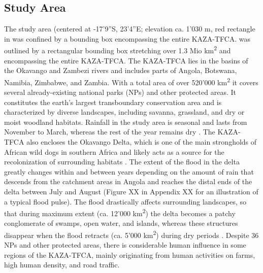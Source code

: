 \documentclass[abstract=on,10pt,a4paper,bibliography=totocnumbered]{article}
\begin{document}
\subsection{Study Area}
The study area (centered at -17'9''S, 23'4''E; elevation ca.
1'030 m, red rectangle in  was confined by a bounding box
encompassing the entire KAZA-TFCA. was outlined by a rectangular bounding box
stretching over 1.3 Mio km\textsuperscript{2} and encompassing the entire
KAZA-TFCA. The KAZA-TFCA lies in the basins of the Okavango and Zambezi rivers
and includes parts of Angola, Botswana, Namibia, Zimbabwe, and Zambia. With a
total area of over 520'000 km\textsuperscript{2} it covers several
already-existing national parks (NPs) and other protected areas. It constitutes
the earth's largest transboundary conservation area and is characterized by
diverse landscapes, including savanna, grassland, and dry or moist woodland
habitats. Rainfall in the study area is seasonal and lasts from November to
March, whereas the rest of the year remains dry \citep{McNutt.1996,
Mendelsohn.2010}. The KAZA-TFCA also encloses the Okavango Delta, which is one
of the main strongholds of African wild dogs in southern Africa and likely acts
as a source for the recolonization of surrounding habitats
\citep{Woodroffe.2012, Cozzi.2013}. The extent of the flood in the delta greatly
changes within and between years depending on the amount of rain that descends
from the catchment areas in Angola and reaches the distal ends of the delta
between July and August (Figure XX in Appendix XX for an illustration of a
typical flood pulse). The flood drastically affects surrounding landscapes, so
that during maximum extent (ca. 12'000 km\textsuperscript{2}) the delta becomes
a patchy conglomerate of swamps, open water, and islands, whereas these
structures disappear when the flood retracts (ca. 5'000 km\textsuperscript{2})
during dry periods \citep{Gumbricht.2004, Wolski.2017}. Despite 36 NPs and other
protected areas, there is considerable human influence in some regions of the
KAZA-TFCA, mainly originating from human activities on farms, high human
density, and road traffic.
\end{document}
